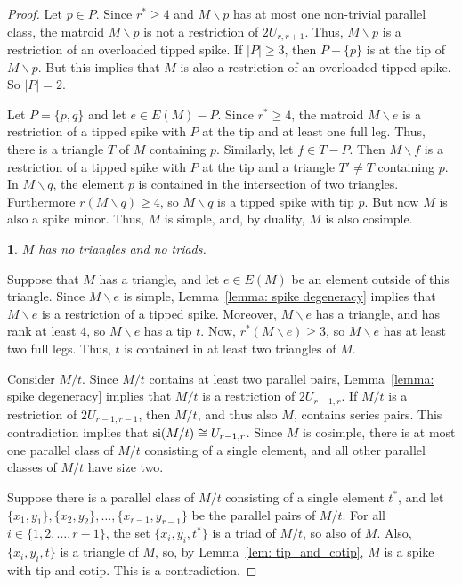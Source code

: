 \documentclass[11pt]{amsart}
\newtheorem{sublemma}{}[theorem]
\numberwithin{equation}{section} %
\newcommand{\si}{{\rm si}}
\begin{document}
\begin{proof}
Let $p\in P$. Since $r^* \geq 4$ and $M \backslash p$ has at most one non-trivial parallel class, the matroid $M \backslash p$ is not a restriction of $2U_{r,r+1}$. Thus, $M \backslash p$ is a restriction of an overloaded tipped spike. If $|P| \geq 3$, then $P-\{p\}$ is at the tip of $M \backslash p$. But this implies that $M$ is also a restriction of an overloaded tipped spike. So $|P| = 2$.

Let $P=\{p, q\}$ and let $e\in E(M)-P$. Since $r^* \geq 4$, the matroid $M\backslash e$ is a restriction of a tipped spike with $P$ at the tip and at least one full leg. Thus, there is a triangle $T$ of $M$ containing $p$. Similarly, let $f\in T - P$. Then $M\backslash f$ is a restriction of a tipped spike with $P$ at the tip and a triangle $T' \neq T$ containing $p$. In $M \backslash q$, the element $p$ is contained in the intersection of two triangles. Furthermore $r(M \backslash q) \geq 4$, so $M \backslash q$ is a tipped spike with tip $p$. But now $M$ is also a spike minor. Thus, $M$ is simple, and, by duality, $M$ is also cosimple.

\begin{sublemma}
\label{lem:no_triangles_or_triads_spikes}
$M$ has no triangles and no triads.
\end{sublemma}

Suppose that $M$ has a triangle, and let $e \in E(M)$ be an element outside of this triangle. Since $M \backslash e$ is simple, Lemma~\ref{lemma: spike degeneracy} implies that $M \backslash e$ is a restriction of a tipped spike. Moreover, $M \backslash e$ has a triangle, and has rank at least $4$, so $M \backslash e$ has a tip $t$. Now, $r^*(M\backslash e) \geq 3$, so $M\backslash e$ has at least two full legs. Thus, $t$ is contained in at least two triangles of $M$.

Consider $M/t$. Since $M/t$ contains at least two parallel pairs, Lemma~\ref{lemma: spike degeneracy} implies that $M / t$ is a restriction of $2U_{r-1,r}$. If $M / t$ is a restriction of $2U_{r-1,r-1}$, then $M / t$, and thus also $M$, contains series pairs. This contradiction implies that $\si(M / t) \cong U_{r-1,r}$. Since $M$ is cosimple, there is at most one parallel class of $M/t$ consisting of a single element, and all other parallel classes of $M/t$ have size two. 

Suppose there is a parallel class of $M / t$ consisting of a single element $t^*$, and let $\{x_1,y_1\},\{x_2,y_2\},\ldots,\{x_{r-1},y_{r-1}\}$ be the parallel pairs of $M/t$. For all $i \in \{1,2,\ldots,r-1\}$, the set $\{x_i,y_i,t^*\}$ is a triad of $M / t$, so also of $M$. Also, $\{x_i,y_i,t\}$ is a triangle of $M$, so, by Lemma~\ref{lem: tip_and_cotip}, $M$ is a spike with tip and cotip. This is a contradiction.


\end{proof}
\end{document}
